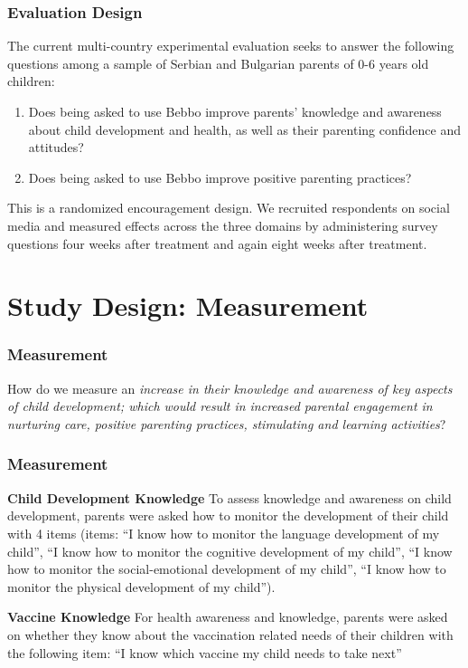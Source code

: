 \documentclass[aspectratio=169]{beamer}
\begin{document}
\begin{frame}
\frametitle{Evaluation Design}

The current multi-country experimental evaluation seeks to answer the following questions among a sample of Serbian and Bulgarian parents of 0-6 years old children:

\begin{enumerate}
\item Does being asked to use Bebbo improve parents’ knowledge and awareness about child development and health, as well as their parenting confidence and attitudes?
\item Does being asked to use Bebbo improve positive parenting practices?
\end{enumerate}

This is a randomized encouragement design. We recruited respondents on social media and measured effects across the three domains by administering survey questions four weeks after treatment and again eight weeks after treatment.

\end{frame}


\section{Study Design: Measurement}

\begin{frame}
\frametitle{Measurement}
How do we measure an \emph{increase in their knowledge and awareness of key aspects of child development; which would result in increased parental engagement in nurturing care, positive parenting practices, stimulating and learning activities}?

\end{frame}

\begin{frame}
  \frametitle{Measurement}

\textbf{Child Development Knowledge}
To assess knowledge and awareness on child development, parents were asked how to monitor the development of their child with 4 items (items: “I know how to monitor the language development of my child”, “I know how to monitor the cognitive development of my child”, “I know how to monitor the social-emotional development of my child”, “I know how to monitor the physical development of my child”).

\textbf{Vaccine Knowledge}
For health awareness and knowledge, parents were asked on whether they know about the vaccination related needs of their children with the following item: “I know which vaccine my child needs to take next”

\end{frame}
\end{document}
